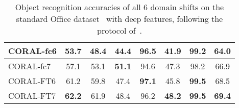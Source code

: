 \documentclass[letterpaper]{article}
\begin{document}
\begin{table}[t]
\begin{center}
{\begin{tabular}{|l||c|c|c|c|c|c|c|}
\hline
\hline
CORAL-fc6	&53.7	&48.4	&44.4	&96.5	&41.9	&99.2&64.0\\
\hline
CORAL-fc7	&57.1	&53.1	&\textbf{51.1}	&94.6	&47.3	&98.2&66.9\\
\hline
CORAL-FT6	&61.2	&59.8	&47.4	&\textbf{97.1}	&45.8	&\textbf{99.5}&68.5\\
\hline
CORAL-FT7	&\textbf{62.2}	&61.9	&48.4	&96.2	&\textbf{48.2}	&\textbf{99.5}&\textbf{69.4}\\
\hline
\end{tabular}
}
\end{center}
\caption{\small Object recognition accuracies of all 6 domain shifts on the standard Office dataset~\cite{saenko2010adapting} with deep features, following the protocol of~\cite{decaf,tzeng_arxiv15,reversegrad}. }
\label{tab:result_office10}
\vspace{-0.1in}
\end{table}

\begin{table*}\small
\centering
{}
\caption{\small Object recognition accuracies of all 12 domain shifts on the Office-Caltech10 dataset~\cite{gfk} with SURF features, using the~\emph{``full training''} protocol.}
\label{tab:result_office10_large}
\vspace{-0.1in}
\end{table*}
\end{document}
